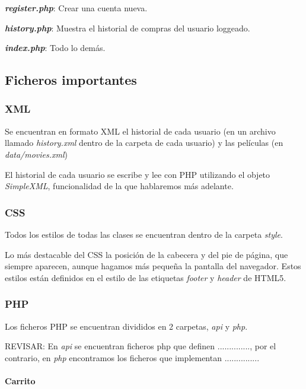 \documentclass{apuntes}
\begin{document}
\textbf{\textit{register.php}}: Crear una cuenta nueva.

\textbf{\textit{history.php}}: Muestra el historial de compras del usuario loggeado.

\textbf{\textit{index.php}}: Todo lo demás.

\subsection{Ficheros importantes}

\subsubsection{XML}

Se encuentran en formato XML el historial de cada usuario (en un archivo llamado \textit{history.xml} dentro de la carpeta de cada usuario) y las películas (en \textit{data/movies.xml})


El historial de cada usuario se escribe y lee con PHP utilizando el objeto \textit{SimpleXML}, funcionalidad de la que hablaremos más adelante.



\subsubsection{CSS}

Todos los estilos de todas las clases se encuentran dentro de la carpeta \textit{style}.

Lo más destacable del CSS la posición de la cabecera y del pie de página, que siempre aparecen, aunque hagamos más pequeña la pantalla del navegador. Estos estilos están definidos en el estilo de las etiquetas \textit{footer} y \textit{header} de HTML5.

\subsubsection{PHP}

Los ficheros PHP se encuentran divididos en 2 carpetas, \textit{api} y \textit{php}. 

\label{CriterioPHP}
REVISAR: En \textit{api} se encuentran ficheros php que definen .............., por el contrario, en \textit{php} encontramos los ficheros que implementan ...............

\paragraph{Carrito}
\end{document}
